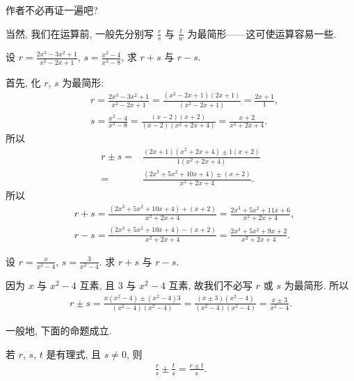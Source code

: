 \begin{pf}
    作者不必再证一遍吧?
\end{pf}

当然, 我们在运算前, 一般先分别写 $\frac{r}{s}$ 与 $\frac{t}{w}$ 为最简形——这可使运算容易一些.

\begin{example}
    设 $r = \frac{2x^3 - 3x^2 + 1}{x^2 - 2x + 1}$, $s = \frac{x^2 - 4}{x^3 - 8}$, 求 $r + s$ 与 $r - s$.

    首先, 化 $r$, $s$ 为最简形:
    \begin{align*}
         & r = \frac{2x^3 - 3x^2 + 1}{x^2 - 2x + 1} = \frac{(x^2 - 2x + 1)(2x + 1)}{(x^2 - 2x + 1)} = \frac{2x + 1}{1}, \\
         & s = \frac{x^2 - 4}{x^3 - 8} = \frac{(x - 2)(x + 2)}{(x - 2)(x^2 + 2x + 4)} = \frac{x + 2}{x^2 + 2x + 4}.
    \end{align*}
    所以
    \begin{align*}
        r \pm s
        = {} & \frac{(2x + 1)(x^2 + 2x + 4) \pm 1 (x + 2)}{1(x^2 + 2x + 4)} \\
        = {} & \frac{(2x^3 + 5x^2 + 10x + 4) \pm (x + 2)}{x^2 + 2x + 4}.
    \end{align*}
    所以
    \begin{align*}
         & r + s = \frac{(2x^3 + 5x^2 + 10x + 4) + (x + 2)}{x^2 + 2x + 4} = \frac{2x^3 + 5x^2 + 11x + 6}{x^2 + 2x + 4}, \\
         & r - s = \frac{(2x^3 + 5x^2 + 10x + 4) - (x + 2)}{x^2 + 2x + 4} = \frac{2x^3 + 5x^2 + 9x + 2}{x^2 + 2x + 4}.
    \end{align*}
\end{example}

\begin{example}
    设 $r = \frac{x}{x^2 - 4}$, $s = \frac{3}{x^2 - 4}$. 求 $r + s$ 与 $r - s$.

    因为 $x$ 与 $x^2 - 4$ 互素, 且 $3$ 与 $x^2 - 4$ 互素, 故我们不必写 $r$ 或 $s$ 为最简形. 所以
    \begin{align*}
        r \pm s = \frac{x (x^2 - 4) \pm (x^2 - 4) 3}{(x^2 - 4)(x^2 - 4)} = \frac{(x \pm 3)(x^2 - 4)}{(x^2 - 4)(x^2 - 4)} = \frac{x \pm 3}{x^2 - 4}.
    \end{align*}
\end{example}

一般地, 下面的命题成立.
\begin{proposition}
    若 $r$, $s$, $t$ 是有理式, 且 $s \neq 0$, 则
    \begin{align*}
        \frac{r}{s} \pm \frac{t}{s} = \frac{r \pm t}{s}.
    \end{align*}
\end{proposition}

